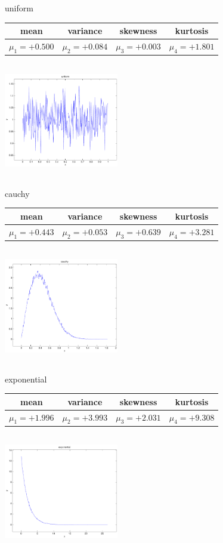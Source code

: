 \documentclass[12pt]{article}
\theoremstyle{definition}
\theoremstyle{remark}
\numberwithin{equation}{section}
\begin{document}
\newpage
uniform \begin{tabular}{|c|c|c|c|}  mean & variance & skewness & kurtosis \\  \hline
$\mu_1 = +0.500$ & $\mu_2 = +0.084$ & $\mu_3 = +0.003$ & $\mu_4 =+1.801$ \\
\end{tabular}

\includegraphics[width=5cm,height=5cm]{uniform.pdf}

cauchy \begin{tabular}{|c|c|c|c|}  mean & variance & skewness & kurtosis \\  \hline
$\mu_1 = +0.443$ & $\mu_2 = +0.053$ & $\mu_3 = +0.639$ & $\mu_4 =+3.281$ \\
\end{tabular}

\includegraphics[width=5cm,height=5cm]{cauchy.pdf}

exponential \begin{tabular}{|c|c|c|c|}  mean & variance & skewness & kurtosis \\  \hline
$\mu_1 = +1.996$ & $\mu_2 = +3.993$ & $\mu_3 = +2.031$ & $\mu_4 =+9.308$ \\
\end{tabular}

\includegraphics[width=5cm,height=5cm]{exponential.pdf}
\end{document}
